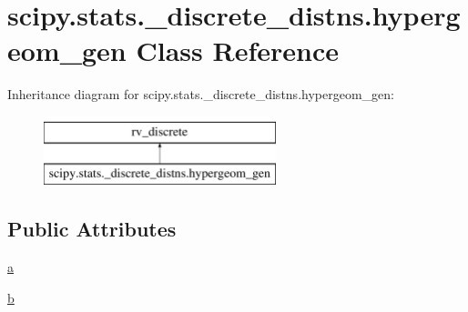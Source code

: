 \hypertarget{classscipy_1_1stats_1_1__discrete__distns_1_1hypergeom__gen}{}\section{scipy.\+stats.\+\_\+discrete\+\_\+distns.\+hypergeom\+\_\+gen Class Reference}
\label{classscipy_1_1stats_1_1__discrete__distns_1_1hypergeom__gen}
Inheritance diagram for scipy.\+stats.\+\_\+discrete\+\_\+distns.\+hypergeom\+\_\+gen\+:\begin{figure}[H]
\begin{center}
\leavevmode
\includegraphics[height=2.000000cm]{classscipy_1_1stats_1_1__discrete__distns_1_1hypergeom__gen}
\end{center}
\end{figure}
\subsection*{Public Attributes}
\begin{DoxyCompactItemize}
\item 
\hyperlink{classscipy_1_1stats_1_1__discrete__distns_1_1hypergeom__gen_a16af028db64b391cc5f2780784969302}{a}
\item 
\hyperlink{classscipy_1_1stats_1_1__discrete__distns_1_1hypergeom__gen_ae934b0cc16615b3111465f16eb6fc2ba}{b}
\end{DoxyCompactItemize}



